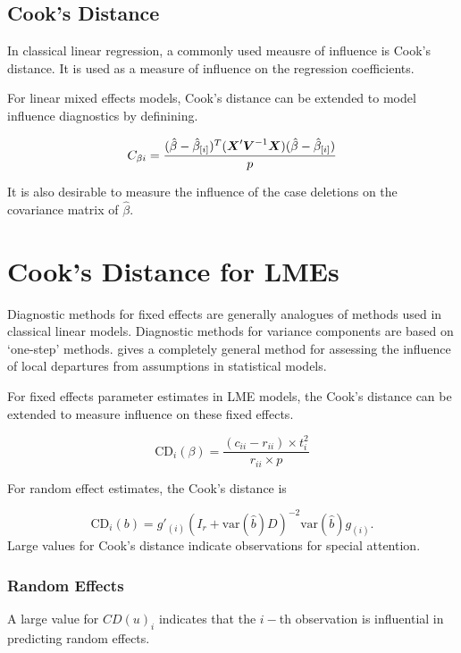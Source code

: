 \documentclass[12pt, a4paper]{article}
\begin{document}
\subsection{Cook's Distance}%
In classical linear regression, a commonly used meausre of influence is Cook's distance. It is used as a measure of influence on the regression coefficients.

For linear mixed effects models, Cook's distance can be extended to model influence diagnostics by definining.

\[ C_{\beta i} = {(\hat{\beta} - \hat{\beta}_{[i]})^{T}(\boldsymbol{X}^{\prime}\boldsymbol{V}^{-1}\boldsymbol{X}) (\hat{\beta} - \hat{\beta}_{[i]}) \over p}\]

It is also desirable to measure the influence of the case deletions on the covariance matrix of $\hat{\beta}$.



\section{Cook's Distance for LMEs} %
Diagnostic methods for fixed effects are generally analogues of methods used in classical linear models.
Diagnostic methods for variance components are based on `one-step' methods. \citet{cook86} gives a completely general method for assessing the influence of local departures from assumptions in statistical models.

For fixed effects parameter estimates in LME models, the  Cook's distance can be extended to measure influence on these fixed effects.

\[
\mbox{CD}_{i}(\beta) = \frac{(c_{ii} - r_{ii}) \times t^2_{i}}{r_{ii} \times p}
\]

For random effect estimates, the  Cook's distance is

\[
\mbox{CD}_{i}(b) = g{\prime}_{(i)} (I_{r} + \mbox{var}(\hat{b})D)^{-2}\mbox{var}(\hat{b})g_{(i)}.
\]
Large values for Cook's distance indicate observations for special attention.










\subsubsection{Random Effects}

A large value for $CD(u)_i$ indicates that the $i-$th observation is influential in predicting random effects.
\end{document}
